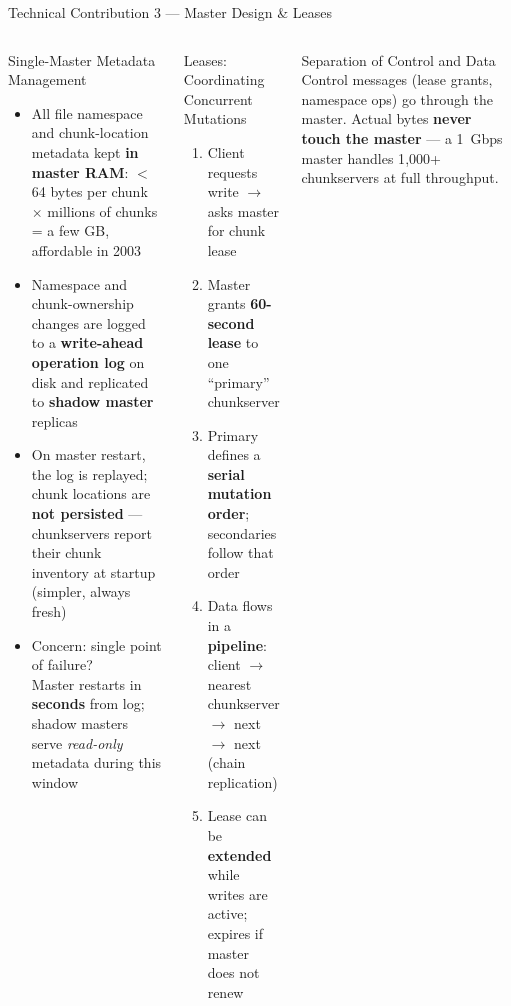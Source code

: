 \documentclass[aspectratio=169,10pt]{beamer}
\begin{document}
\begin{frame}{Technical Contribution 3 — Master Design \& Leases}
  \begin{columns}[T]
      \begin{block}{Single-Master Metadata Management}
        \begin{itemize}
          \item All file namespace and chunk-location metadata kept
                \textbf{in master RAM}: $<$64 bytes per chunk $\times$
                millions of chunks = a few GB, affordable in 2003
          \item Namespace and chunk-ownership changes are logged to
                a \textbf{write-ahead operation log} on disk
                and replicated to \textbf{shadow master} replicas
          \item On master restart, the log is replayed;
                chunk locations are \textbf{not persisted} — chunkservers
                report their chunk inventory at startup (simpler, always fresh)
          \item Concern: single point of failure?\\
                Master restarts in \textbf{seconds} from log;
                shadow masters serve \emph{read-only} metadata during this window
        \end{itemize}
      \end{block}

      \begin{block}{Leases: Coordinating Concurrent Mutations}
        \begin{enumerate}
          \item Client requests write $\to$ asks master for chunk lease
          \item Master grants \textbf{60-second lease} to one
                ``primary'' chunkserver
          \item Primary defines a \textbf{serial mutation order};
                secondaries follow that order
          \item Data flows in a \textbf{pipeline}: client $\to$ nearest
                chunkserver $\to$ next $\to$ next (chain replication)
          \item Lease can be \textbf{extended} while writes are active;
                expires if master does not renew
        \end{enumerate}
      \end{block}
      \vspace{4pt}
      \begin{alertblock}{Separation of Control and Data}
        Control messages (lease grants, namespace ops) go through
        the master.
        Actual bytes \textbf{never touch the master} —
        a 1~Gbps master handles 1{,}000+ chunkservers at full throughput.
      \end{alertblock}
  \end{columns}
\end{frame}
\end{document}
